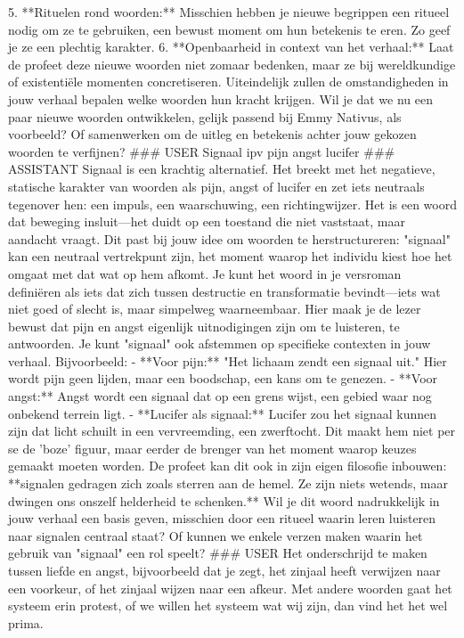 5. **Rituelen rond woorden:** Misschien hebben je nieuwe begrippen een ritueel nodig om ze te gebruiken, een bewust moment om hun betekenis te eren. Zo geef je ze een plechtig karakter.
6. **Openbaarheid in context van het verhaal:** Laat de profeet deze nieuwe woorden niet zomaar bedenken, maar ze bij wereldkundige of existentiële momenten concretiseren. Uiteindelijk zullen de omstandigheden in jouw verhaal bepalen welke woorden hun kracht krijgen.
Wil je dat we nu een paar nieuwe woorden ontwikkelen, gelijk passend bij Emmy Nativus, als voorbeeld? Of samenwerken om de uitleg en betekenis achter jouw gekozen woorden te verfijnen?
\#\#\# USER
Signaal ipv pijn angst lucifer
\#\#\# ASSISTANT
Signaal is een krachtig alternatief. Het breekt met het negatieve, statische karakter van woorden als pijn, angst of lucifer en zet iets neutraals tegenover hen: een impuls, een waarschuwing, een richtingwijzer. Het is een woord dat beweging insluit—het duidt op een toestand die niet vaststaat, maar aandacht vraagt.
Dit past bij jouw idee om woorden te herstructureren: "signaal" kan een neutraal vertrekpunt zijn, het moment waarop het individu kiest hoe het omgaat met dat wat op hem afkomt. Je kunt het woord in je versroman definiëren als iets dat zich tussen destructie en transformatie bevindt—iets wat niet goed of slecht is, maar simpelweg waarneembaar. Hier maak je de lezer bewust dat pijn en angst eigenlijk uitnodigingen zijn om te luisteren, te antwoorden.
Je kunt "signaal" ook afstemmen op specifieke contexten in jouw verhaal. Bijvoorbeeld:
- **Voor pijn:** "Het lichaam zendt een signaal uit." Hier wordt pijn geen lijden, maar een boodschap, een kans om te genezen.
- **Voor angst:** Angst wordt een signaal dat op een grens wijst, een gebied waar nog onbekend terrein ligt.
- **Lucifer als signaal:** Lucifer zou het signaal kunnen zijn dat licht schuilt in een vervreemding, een zwerftocht. Dit maakt hem niet per se de 'boze' figuur, maar eerder de brenger van het moment waarop keuzes gemaakt moeten worden.
De profeet kan dit ook in zijn eigen filosofie inbouwen: **signalen gedragen zich zoals sterren aan de hemel. Ze zijn niets wetends, maar dwingen ons onszelf helderheid te schenken.**
Wil je dit woord nadrukkelijk in jouw verhaal een basis geven, misschien door een ritueel waarin leren luisteren naar signalen centraal staat? Of kunnen we enkele verzen maken waarin het gebruik van "signaal" een rol speelt?
\#\#\# USER
Het onderschrijd te maken tussen liefde en angst, bijvoorbeeld dat je zegt, het zinjaal heeft verwijzen naar een voorkeur, of het zinjaal wijzen naar een afkeur. Met andere woorden gaat het systeem erin protest, of we willen het systeem wat wij zijn, dan vind het het wel prima.
